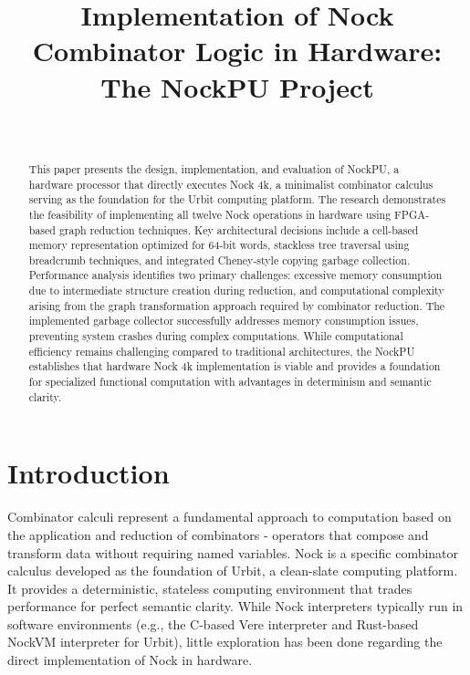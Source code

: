 \documentclass[twoside]{article}
\title{Implementation of Nock Combinator Logic in Hardware: The NockPU Project}
\author{\authorpatp \\ \affiliation}
\date{}
\begin{document}
\maketitle
\thispagestyle{firststyle}

\begin{abstract}
This paper presents the design, implementation, and evaluation of NockPU, a hardware processor that directly executes Nock 4k, a minimalist combinator calculus serving as the foundation for the Urbit computing platform. The research demonstrates the feasibility of implementing all twelve Nock operations in hardware using FPGA-based graph reduction techniques. Key architectural decisions include a cell-based memory representation optimized for 64-bit words, stackless tree traversal using breadcrumb techniques, and integrated Cheney-style copying garbage collection. Performance analysis identifies two primary challenges: excessive memory consumption due to intermediate structure creation during reduction, and computational complexity arising from the graph transformation approach required by combinator reduction. The implemented garbage collector successfully addresses memory consumption issues, preventing system crashes during complex computations. While computational efficiency remains challenging compared to traditional architectures, the NockPU establishes that hardware Nock 4k implementation is viable and provides a foundation for specialized functional computation with advantages in determinism and semantic clarity.
\end{abstract}

\setcounter{page}{1}

\tableofcontents

\section{Introduction}

Combinator calculi represent a fundamental approach to computation based on the application and reduction of combinators - operators that compose and transform data without requiring named variables. Nock is a specific combinator calculus developed as the foundation of Urbit, a clean-slate computing platform. It provides a deterministic, stateless computing environment that trades performance for perfect semantic clarity. While Nock interpreters typically run in software environments (e.g., the C-based Vere interpreter and Rust-based NockVM interpreter for Urbit), little exploration has been done regarding the direct implementation of Nock in hardware.
\end{document}
